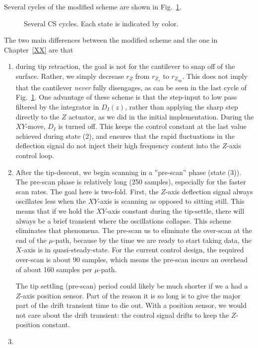 \documentclass[11pt]{article}
\begin{document}
Several cycles of the modified scheme are shown in Fig.~\ref{fig:cs_cycle_final}.
\begin{figure}
  \centering
  
  \caption{Several CS cycles. Each state is indicated by color.}
  \label{fig:cs_cycle_final}
\end{figure}
The two main differences between the modified scheme and the one in Chapter~\ref{XX} are that
\begin{enumerate}
\item during tip retraction, the goal is not for the cantilever to snap off of the surface. Rather, we simply decrease $r_Z$ from $r_{Z_s}$ to $r_{Z_{up}}$. This does not imply that the cantilever \emph{never} fully disengages, as can be seen in the last cycle of Fig.~\ref{fig:cs_cycle_final}. One advantage of these scheme is that the step-input to low pass filtered by the integrator in $D_I(z)$, rather than applying the sharp step directly to the $Z$ actuator, as we did in the initial implementation. During the $XY$-move, $D_I$ is turned off. This keeps the control constant at the last value achieved during state (2), and ensures that the rapid fluctuations in the deflection signal do not inject their high frequency content into the $Z$-axis control loop.
\item After the tip-descent, we begin scanning in a ''pre-scan'' phase (state (3)). The pre-scan phase is relatively long (250 samples), especially for the faster scan rates. The goal here is two-fold. First, the $Z$-axis deflection signal always oscillates less when the $XY$-axis is scanning as opposed to sitting still. This means that if we hold the $XY$-axis constant during the tip-settle, there will always be a brief transient where the oscillations collapse. This scheme eliminates that phenomena. The pre-scan us to eliminate the over-scan at the end of the $\mu$-path, because by the time we are ready to start taking data, the $X$-axis is in quasi-steady-state. For the current control design, the required over-scan is about 90 samples, which means the pre-scan incurs an overhead of about 160 samples per $\mu$-path.

The tip settling (pre-scan) period could likely be much shorter if we a had a $Z$-axis position sensor. Part of the reason it is so long is to give the major part of the drift transient time to die out. With a position sensor, we would not care about the drift transient: the control signal drifts to keep the $Z$-position constant.

\item 
\end{enumerate}
\end{document}
